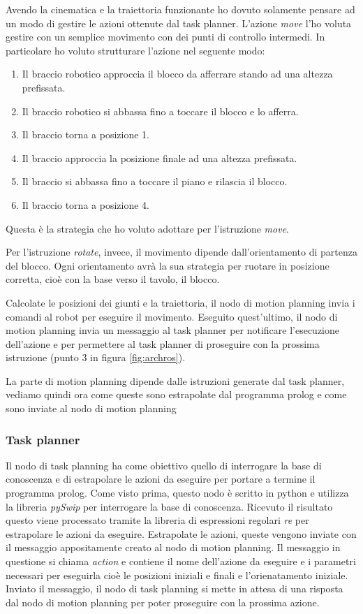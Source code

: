 Avendo la cinematica e la traiettoria funzionante ho dovuto solamente pensare ad un modo di gestire le azioni ottenute dal task planner. L'azione \textit{move} l'ho voluta gestire con un semplice movimento con dei punti di controllo intermedi. In particolare ho voluto strutturare l'azione nel seguente modo:
\begin{enumerate}
    \item Il braccio robotico approccia il blocco da afferrare stando ad una altezza prefissata.
    \item Il braccio robotico si abbassa fino a toccare il blocco e lo afferra.
    \item Il braccio torna a posizione 1.
    \item Il braccio approccia la posizione finale ad una altezza prefissata.
    \item Il braccio si abbassa fino a toccare il piano e rilascia il blocco.
    \item Il braccio torna a posizione 4.
\end{enumerate}
Questa è la strategia che ho voluto adottare per l'istruzione \textit{move}.

Per l'istruzione \textit{rotate}, invece, il movimento dipende dall'orientamento di partenza del blocco. 
Ogni orientamento avrà la sua strategia per ruotare in posizione corretta, cioè con la base verso il tavolo, il blocco.

Calcolate le posizioni dei giunti e la traiettoria, il nodo di motion planning invia i comandi al robot per eseguire il movimento.
Eseguito quest'ultimo, il nodo di motion planning invia un messaggio al task planner per notificare l'esecuzione dell'azione e per permettere al task planner di proseguire con la prossima istruzione (punto 3 in figura \ref{fig:archros}).

La parte di motion planning dipende dalle istruzioni generate dal task planner, vediamo quindi ora come queste sono estrapolate dal programma prolog e come sono inviate al nodo di motion planning
\subsubsection{Task planner}
\label{subsubsec:taskplanner}
Il nodo di task planning ha come obiettivo quello di interrogare la base di conoscenza e di estrapolare le azioni da eseguire per portare a termine il programma prolog.
Come visto prima, questo nodo è scritto in python e utilizza la libreria \textit{pySwip} per interrogare la base di conoscenza. 
Ricevuto il risultato questo viene processato tramite la libreria di espressioni regolari \textit{re} per estrapolare le azioni da eseguire. 
Estrapolate le azioni, queste vengono inviate con il messaggio appositamente creato al nodo di motion planning. Il messaggio in questione si chiama \textit{action} e contiene il nome dell'azione da eseguire e i parametri necessari per eseguirla cioè le posizioni iniziali e finali e l'orienatamento iniziale.
Inviato il messaggio, il nodo di task planning si mette in attesa di una risposta dal nodo di motion planning per poter proseguire con la prossima azione.

